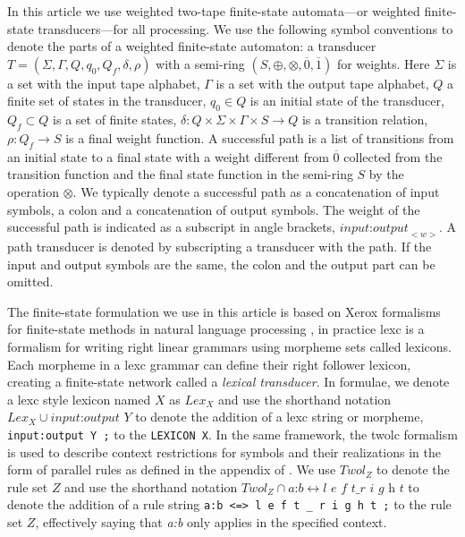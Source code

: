 \documentclass[a4paper,runningheads]{llncs}
\begin{document}
In this article we use weighted two-tape finite-state automata---or
weighted finite-state transducers---for all processing. We use the
following symbol conventions to denote the parts of a weighted
finite-state automaton: a transducer $T = (\Sigma, \Gamma, Q, q_0,
Q_f, \delta, \rho)$ with a semi-ring $(S, \oplus, \otimes,
\overline{0}, \overline{1})$ for weights. Here $\Sigma$ is a set with
the input tape alphabet, $\Gamma$ is a set with the output tape
alphabet, $Q$ a finite set of states in the transducer, $q_0 \in Q$ is
an initial state of the transducer, $Q_f \subset Q$ is a set of finite
states, $\delta: Q \times \Sigma \times \Gamma \times S \rightarrow Q$
is a transition relation, $\rho: Q_f \rightarrow S$ is a final weight
function. A successful path is a list of transitions from an initial
state to a final state with a weight different from $\overline{0}$
collected from the transition function and the final state function in
the semi-ring $S$ by the operation $\otimes$. We typically denote a
successful path as a concatenation of input symbols, a colon and a
concatenation of output symbols. The weight of the successful path is
indicated as a subscript in angle brackets,
$\textit{input:output}_{<w>}$. A path transducer is denoted by
subscripting a transducer with the path.  If the input and output
symbols are the same, the colon and the output part can be omitted.

The finite-state formulation we use in this article is based on Xerox
formalisms for finite-state methods in natural language processing
\cite{beesley/2003}, in practice lexc is a formalism for writing right linear
grammars using morpheme sets called lexicons. Each morpheme in a lexc grammar
can define their right follower lexicon, creating a finite-state network called
a \emph{lexical transducer}. In formulae, we denote a lexc style lexicon named $X$ as
$Lex_X$ and use the shorthand notation $Lex_X \cup \textit{input:output Y}$ to
denote the addition of a lexc string or morpheme, \texttt{input:output Y ;} to
the \texttt{LEXICON X}.  In the same framework, the twolc formalism is used to
describe context restrictions for symbols and their realizations in the form of
parallel rules as defined in the appendix of \cite{beesley/2003}. We use
$Twol_Z$ to denote the rule set $Z$ and use the shorthand notation $Twol_Z \cap
\textit{a:b} \leftrightarrow \textit{l e f t} \_ \textit{r i g h t}$ to denote
the addition of a rule string \texttt{a:b <=> l e f t \_ r i g h t ;} to the
rule set $Z$, effectively saying that \textit{a:b} only applies in
the specified context.
\end{document}
